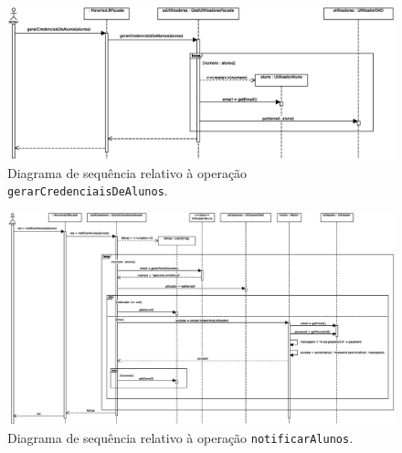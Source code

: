 \documentclass[12pt, a4paper]{article}
\begin{document}
\begin{landscape}
        \vspace*{\fill}
        \pagebreak
        \vspace*{\fill}

        \begin{figure}[H]
            \centering
            \includegraphics[scale=0.9]{Imagens/Modelos/gerarCredenciaisDeAlunosDAO.svg.eps}
            \caption{
                Diagrama de sequência relativo à operação \texttt{gerarCredenciaisDeAlunos}.
            }
        \end{figure}

        \vspace*{\fill}
        \pagebreak
        \vspace*{\fill}

        \begin{figure}[H]
            \centering
            \includegraphics[scale=0.60]{Imagens/Modelos/notificarAlunosDAO.svg.eps}
            \caption{
                Diagrama de sequência relativo à operação \texttt{notificarAlunos}.
            }
        \end{figure}

        \vspace*{\fill}
        \pagebreak
        \vspace*{\fill}


\end{landscape}
\end{document}

